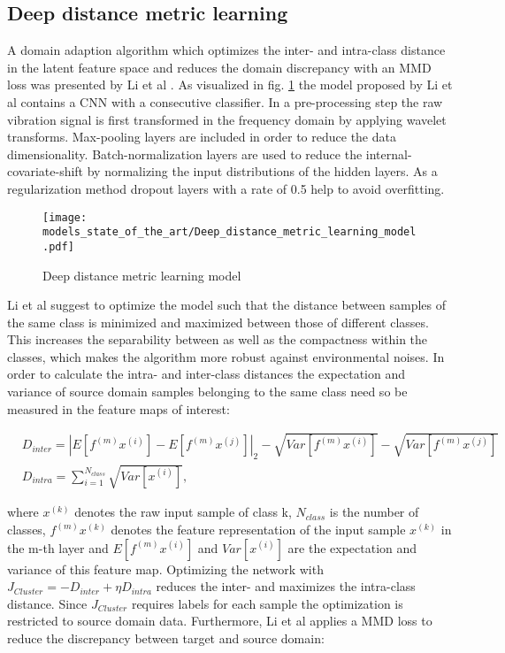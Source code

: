 \subsection{Deep distance metric learning}
A domain adaption algorithm which optimizes the inter- and intra-class distance in the latent feature space and reduces the domain discrepancy with an MMD loss was presented by Li et al \cite{Li2018}. As visualized in fig. \ref{fig:Deep_distance_metric_learning_model} the model proposed by Li et al contains a CNN with a consecutive classifier. In a pre-processing step the raw vibration signal is first transformed in the frequency domain by applying wavelet transforms. Max-pooling layers are included in order to reduce the data dimensionality. Batch-normalization layers are used to reduce the internal-covariate-shift by normalizing the input distributions of the hidden layers. As a regularization method dropout layers with a rate of 0.5 help to avoid overfitting. 

\begin{figure}[H]
  \centering
  \texttt{[image: models\_state\_of\_the\_art/Deep\_distance\_metric\_learning\_model.pdf]}
  \caption{Deep distance metric learning model \cite{Li2018}}
  \label{fig:Deep_distance_metric_learning_model}
\end{figure}

Li et al suggest to optimize the model such that the distance between samples of the same class is minimized and maximized between those of different classes. This increases the separability between as well as the compactness within the classes, which makes the algorithm more robust against environmental noises. In order to calculate the intra- and inter-class distances the expectation and variance of source domain samples belonging to the same class need so be measured in the feature maps of interest:

\begin{equation}
    \begin{aligned}
       &D_{inter} = |E[f^{(m)}x^{(i)}]-E[f^{(m)}x^{(j)}]|_{2}-\sqrt{Var[f^{(m)}x^{(i)}]}-\sqrt{Var[f^{(m)}x^{(j)}]}\\
       &D_{intra} = 
        \sum_{i=1}^{N_{class}} \sqrt{Var[x^{(i)}]},
    \end{aligned}
\end{equation}

where $x^{(k)}$ denotes the raw input sample of class k, $N_{class}$ is the number of classes, $f^{(m)}x^{(k)}$ denotes the feature representation of the input sample $x^{(k)}$ in the m-th layer and $E[f^{(m)}x^{(i)}]$ and $Var[x^{(i)}]$ are the  expectation and variance of this feature map. Optimizing the network with $J_{Cluster} = - D_{inter} + \eta D_{intra}$ reduces the inter- and maximizes the intra-class distance. Since $J_{Cluster}$  requires labels for each sample the optimization is restricted to source domain data. Furthermore, Li et al applies a MMD loss to reduce the discrepancy between target and source domain: 


